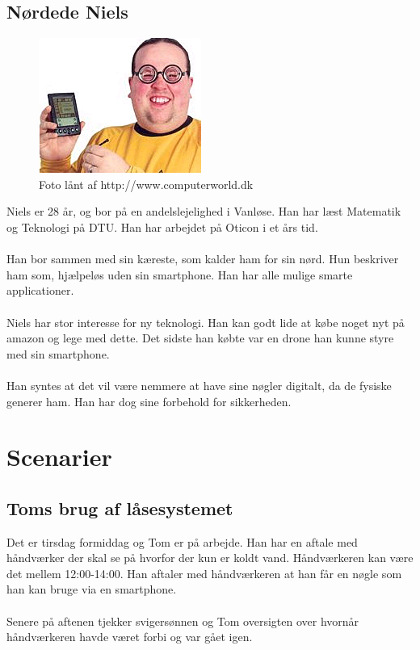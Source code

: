 \documentclass[a4paper,12pt]{article}
\begin{document}
\subsection{Nørdede Niels}
\begin{figure}[h!]
\centering
\includegraphics[scale=0.8]{niels}
\caption{Foto lånt af http://www.computerworld.dk}
\label{fig: niels}
\end{figure}
Niels er 28 år, og bor på en andelslejelighed i Vanløse. Han har læst Matematik og Teknologi på DTU. Han har arbejdet på Oticon i et års tid.
\\ \\
Han bor sammen med sin kæreste, som kalder ham for sin nørd. Hun beskriver ham som, hjælpeløs uden sin smartphone. Han har alle mulige smarte applicationer.
\\ \\  
Niels har stor interesse for ny teknologi. Han kan godt lide at købe noget nyt på amazon og lege med dette. Det sidste han købte var en drone han kunne styre med sin smartphone.
\\ \\
Han syntes at det vil være nemmere at have sine nøgler digitalt, da de fysiske generer ham. Han har dog sine forbehold for sikkerheden.

\section{Scenarier}
\subsection{Toms brug af låsesystemet}
Det er tirsdag formiddag og Tom er på arbejde. Han har en aftale med håndværker der skal se på hvorfor der kun er koldt vand. Håndværkeren kan være det mellem 12:00-14:00. Han aftaler med håndværkeren at han får en nøgle som han kan bruge via en smartphone.
\\ \\
Senere på aftenen tjekker svigersønnen og Tom oversigten over hvornår håndværkeren havde været forbi og var gået igen.
\end{document}

